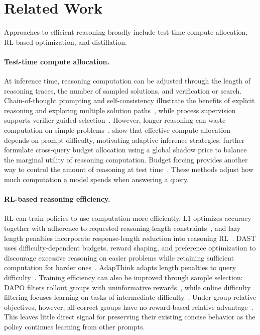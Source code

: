 \section{Related Work}
\label{app:related-work}

Approaches to efficient reasoning broadly include test-time compute allocation, RL-based optimization, and distillation. 

\paragraph{Test-time compute allocation.}
At inference time, reasoning computation can be adjusted through the length of reasoning traces, the number of sampled solutions, and verification or search. Chain-of-thought prompting and self-consistency illustrate the benefits of explicit reasoning and exploring multiple solution paths~\citep{wei2022chain,wang2022self}, while process supervision supports verifier-guided selection~\citep{lightman2024lets}. However, longer reasoning can waste computation on simple problems~\citep{chen2024not}. \citet{snell2024scaling} show that effective compute allocation depends on prompt difficulty, motivating adaptive inference strategies. \citet{wan2026shadow} further formulate cross-query budget allocation using a global shadow price to balance the marginal utility of reasoning computation. Budget forcing provides another way to control the amount of reasoning at test time~\citep{muennighoff2025s1}. These methods adjust how much computation a model spends when answering a query.

\paragraph{RL-based reasoning efficiency.}
RL can train policies to use computation more efficiently. L1 optimizes accuracy together with adherence to requested reasoning-length constraints~\citep{aggarwal2025l1}, and lazy length penalties incorporate response-length reduction into reasoning RL~\citep{yuan2026shorten}. DAST uses difficulty-dependent budgets, reward shaping, and preference optimization to discourage excessive reasoning on easier problems while retaining sufficient computation for harder ones~\citep{shen2025dast}. AdapThink adapts length penalties to query difficulty~\citep{xu2026adapthink}. Training efficiency can also be improved through sample selection: DAPO filters rollout groups with uninformative rewards~\citep{yu2025dapo}, while online difficulty filtering focuses learning on tasks of intermediate difficulty~\citep{bae2026online}. Under group-relative objectives, however, all-correct groups have no reward-based relative advantage~\citep{shao2024deepseekmath}. This leaves little direct signal for preserving their existing concise behavior as the policy continues learning from other prompts.

